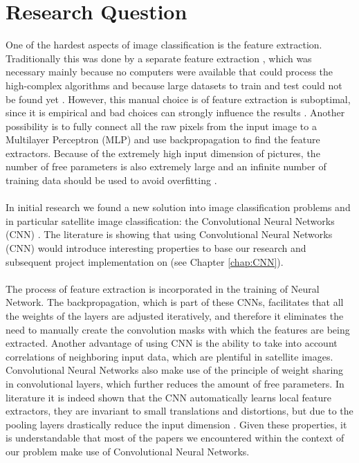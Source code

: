 \documentclass[a4paper,onecolumn]{report}
\begin{document}
\chapter{Research Question}
\label{chap:researchquestion}
One of the hardest aspects of image classification is the feature extraction. Traditionally this was done by a separate feature extraction \cite{duda1973pattern}, which was necessary mainly because no computers were available that could process the high-complex algorithms and because large datasets to train and test could not be found yet \cite{lecun1998gradient}. However, this manual choice is of feature extraction is suboptimal, since it is empirical and bad choices can strongly influence the results \cite{duffner2008face}. 
Another possibility is to fully connect all the raw pixels from the input image to a Multilayer Perceptron (MLP) and use backpropagation to find the feature extractors. Because of the extremely high input dimension of pictures, the number of free parameters is also extremely large and an infinite number of training data should be used to avoid overfitting \cite{hawkins2004problem}.
\\\\
In initial research we found a new solution into image classification problems and in particular satellite image classification: the Convolutional Neural Networks (CNN) \cite{Hongsheng2014} \cite{Farabet2013}. The literature is showing that using Convolutional Neural Networks (CNN) would introduce interesting properties to base our research and subsequent project implementation on (see Chapter \ref{chap:CNN}).
\\\\
The process of feature extraction is incorporated in the training of Neural Network. The backpropagation, which is part of these CNNs, facilitates that all the weights of the layers are adjusted iteratively, and therefore it eliminates the need to manually create the convolution masks with which the features are being extracted. Another advantage of using CNN is the ability to take into account correlations of neighboring input data, which are plentiful in satellite images. Convolutional Neural Networks also make use of the principle of weight sharing in convolutional layers, which further reduces the amount of free parameters. In literature it is indeed shown that the CNN automatically learns local feature extractors, they are invariant to small translations and distortions, but due to the pooling layers drastically reduce the input dimension \cite{duffner2008face}. Given these properties, it is understandable that most of the papers we encountered within the context of our problem make use of Convolutional Neural Networks.
\end{document}
